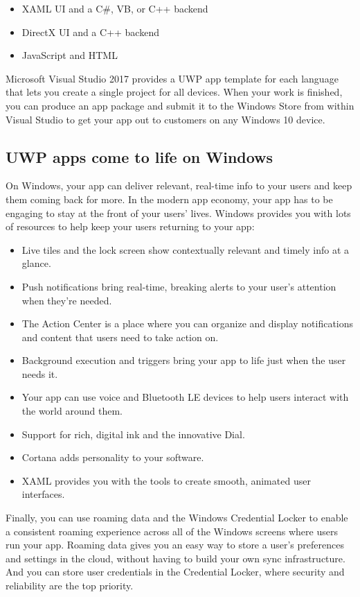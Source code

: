 \begin{itemize}
	\item XAML UI and a C\#, VB, or C++ backend
\item DirectX UI and a C++ backend
\item JavaScript and HTML
\end{itemize}

Microsoft Visual Studio 2017 provides a UWP app template for each language that lets you create a single project for all devices. When your work is finished, you can produce an app package and submit it to the Windows Store from within Visual Studio to get your app out to customers on any Windows 10 device.

\subsection{UWP apps come to life on Windows}
On Windows, your app can deliver relevant, real-time info to your users and keep them coming back for more. In the modern app economy, your app has to be engaging to stay at the front of your users’ lives. Windows provides you with lots of resources to help keep your users returning to your app:

\begin{itemize}
	\item Live tiles and the lock screen show contextually relevant and timely info at a glance.
\item Push notifications bring real-time, breaking alerts to your user’s attention when they're needed.
\item The Action Center is a place where you can organize and display notifications and content that users need to take action on.
\item Background execution and triggers bring your app to life just when the user needs it.
\item Your app can use voice and Bluetooth LE devices to help users interact with the world around them.
\item Support for rich, digital ink and the innovative Dial.
\item Cortana adds personality to your software.
\item XAML provides you with the tools to create smooth, animated user interfaces.
\end{itemize}

Finally, you can use roaming data and the Windows Credential Locker to enable a consistent roaming experience across all of the Windows screens where users run your app. Roaming data gives you an easy way to store a user’s preferences and settings in the cloud, without having to build your own sync infrastructure. And you can store user credentials in the Credential Locker, where security and reliability are the top priority.

